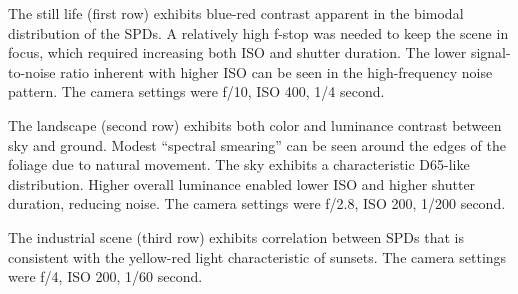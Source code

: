 \documentclass[twocolumn,10pt]{asme2ej}
\newcommand{\id}{\hspace{6 mm}}
\begin{document}
\id The still life (first row) exhibits blue-red contrast apparent in the bimodal distribution of the SPDs. A relatively high f-stop was needed to keep the scene in focus, which required increasing both ISO and shutter duration. The lower signal-to-noise ratio inherent with higher ISO can be seen in the high-frequency noise pattern. The camera settings were f/10, ISO 400, 1/4 second.

\id The landscape (second row) exhibits both color and luminance contrast between sky and ground. Modest ``spectral smearing'' can be seen around the edges of the foliage due to natural movement. The sky exhibits a characteristic D65-like distribution. Higher overall luminance enabled lower ISO and higher shutter duration, reducing noise. The camera settings were f/2.8, ISO 200, 1/200 second.

\id The industrial scene (third row) exhibits correlation between SPDs that is consistent with the yellow-red light characteristic of sunsets. The camera settings were f/4, ISO 200, 1/60 second.

\vfill
\end{document}
